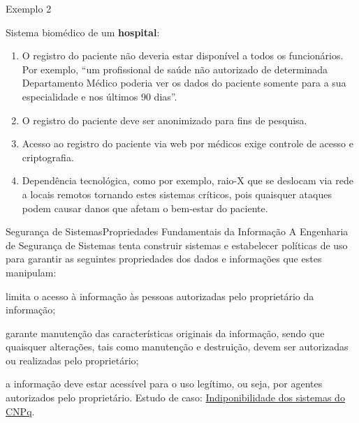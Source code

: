 \begin{frame}{Exemplo 2~\small\cite{ross2008}}\small

  Sistema biomédico de um {\bf hospital}:
  
  \begin{enumerate}[<+-| alert@+>]
  \item O registro do paciente não deveria estar disponível a todos os funcionários.
    Por exemplo, ``um profissional de saúde não autorizado de determinada Departamento Médico poderia ver os dados
    do paciente somente para a sua especialidade e nos últimos 90 dias''.
  \item O registro do paciente deve ser anonimizado para fins de pesquisa.
  \item Acesso ao registro do paciente via web por médicos exige controle de acesso e
    criptografia.
  \item Dependência tecnológica, como por exemplo, raio-X que se deslocam via rede
    a locais remotos tornando estes sistemas críticos, pois quaisquer ataques podem
    causar danos que afetam o bem-estar do paciente.
  \end{enumerate}
  
\end{frame}


\begin{frame}{Segurança de Sistemas}{Propriedades Fundamentais da Informação}
  A Engenharia de Segurança de Sistemas tenta construir sistemas e
  estabelecer políticas de uso para garantir as seguintes propriedades
  dos dados e informações que estes manipulam:

  \begin{description}[<+-| alert@+>]
  \item[Confidencialidade:] limita o acesso à informação às pessoas
    autorizadas pelo proprietário da informação;
  \item[Integridade:] garante manutenção das características originais
    da informação, sendo que quaisquer alterações, tais como
    manutenção e destruição, devem ser autorizadas ou realizadas pelo
    proprietário;
  \item[Disponibilidade:] a informação deve estar acessível para o uso
    legítimo, ou seja, por agentes autorizados pelo proprietário.
    Estudo de caso: 
    \href{https://www.youtube.com/watch?v=rtqI3P18WBQ\&t}{Indiponibilidade dos sistemas do CNPq}.
  \end{description}
  
\end{frame}

